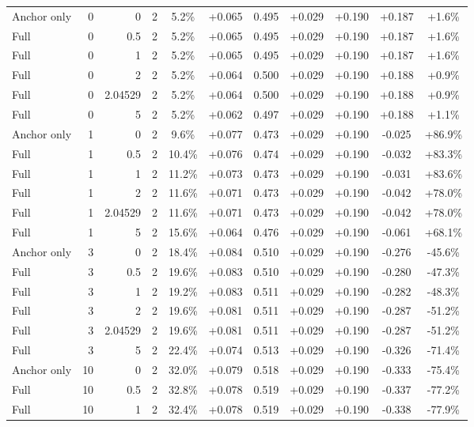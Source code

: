 \begin{table}[htbp]
\begin{tabular}{lrrrccccccc}
Anchor only & 0 & 0 & 2 & 5.2\% & +0.065 & 0.495 & +0.029 & +0.190 & +0.187 & +1.6\% \\
Full & 0 & 0.5 & 2 & 5.2\% & +0.065 & 0.495 & +0.029 & +0.190 & +0.187 & +1.6\% \\
Full & 0 & 1 & 2 & 5.2\% & +0.065 & 0.495 & +0.029 & +0.190 & +0.187 & +1.6\% \\
Full & 0 & 2 & 2 & 5.2\% & +0.064 & 0.500 & +0.029 & +0.190 & +0.188 & +0.9\% \\
Full & 0 & 2.04529 & 2 & 5.2\% & +0.064 & 0.500 & +0.029 & +0.190 & +0.188 & +0.9\% \\
Full & 0 & 5 & 2 & 5.2\% & +0.062 & 0.497 & +0.029 & +0.190 & +0.188 & +1.1\% \\
Anchor only & 1 & 0 & 2 & 9.6\% & +0.077 & 0.473 & +0.029 & +0.190 & -0.025 & +86.9\% \\
Full & 1 & 0.5 & 2 & 10.4\% & +0.076 & 0.474 & +0.029 & +0.190 & -0.032 & +83.3\% \\
Full & 1 & 1 & 2 & 11.2\% & +0.073 & 0.473 & +0.029 & +0.190 & -0.031 & +83.6\% \\
Full & 1 & 2 & 2 & 11.6\% & +0.071 & 0.473 & +0.029 & +0.190 & -0.042 & +78.0\% \\
Full & 1 & 2.04529 & 2 & 11.6\% & +0.071 & 0.473 & +0.029 & +0.190 & -0.042 & +78.0\% \\
Full & 1 & 5 & 2 & 15.6\% & +0.064 & 0.476 & +0.029 & +0.190 & -0.061 & +68.1\% \\
Anchor only & 3 & 0 & 2 & 18.4\% & +0.084 & 0.510 & +0.029 & +0.190 & -0.276 & -45.6\% \\
Full & 3 & 0.5 & 2 & 19.6\% & +0.083 & 0.510 & +0.029 & +0.190 & -0.280 & -47.3\% \\
Full & 3 & 1 & 2 & 19.2\% & +0.083 & 0.511 & +0.029 & +0.190 & -0.282 & -48.3\% \\
Full & 3 & 2 & 2 & 19.6\% & +0.081 & 0.511 & +0.029 & +0.190 & -0.287 & -51.2\% \\
Full & 3 & 2.04529 & 2 & 19.6\% & +0.081 & 0.511 & +0.029 & +0.190 & -0.287 & -51.2\% \\
Full & 3 & 5 & 2 & 22.4\% & +0.074 & 0.513 & +0.029 & +0.190 & -0.326 & -71.4\% \\
Anchor only & 10 & 0 & 2 & 32.0\% & +0.079 & 0.518 & +0.029 & +0.190 & -0.333 & -75.4\% \\
Full & 10 & 0.5 & 2 & 32.8\% & +0.078 & 0.519 & +0.029 & +0.190 & -0.337 & -77.2\% \\
Full & 10 & 1 & 2 & 32.4\% & +0.078 & 0.519 & +0.029 & +0.190 & -0.338 & -77.9\% \\

\end{tabular}
\end{table}
